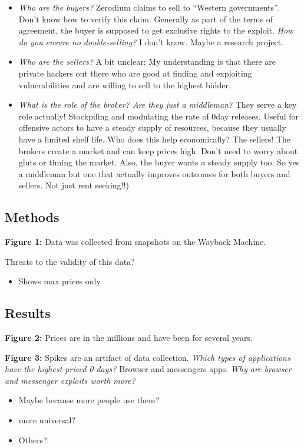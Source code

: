 \documentclass[11pt]{article}
\begin{document}
\begin{itemize}
    \item {\it Who are the buyers?} Zerodium claims to sell to ``Western governments''. Don't know how to verify this claim. Generally as part of the terms of agreement, the buyer is supposed to get exclusive rights to the exploit. {\it How do you ensure no double-selling?} I don't know. Maybe a research project. 
    \item {\it Who are the sellers?} A bit unclear; My understanding is that there are private hackers out there who are good at finding and exploiting vulnerabilities and are willing to sell to the highest bidder.  
    \item {\it What is the role of the broker? Are they just a middleman?} They serve a key role actually! Stockpiling and modulating the rate of 0day releases. Useful for offensive actors to have a steady supply of resources, because they usually have a limited shelf life. Who does this help economically? The sellers! The brokers create a market and can keep prices high. Don't need to worry about gluts or timing the market. Also, the buyer wants a steady supply too. So yes a middleman but one that actually improves outcomes for both buyers and sellers. Not just rent seeking!!)
\end{itemize}

\subsection{Methods}

{\bf Figure 1:} Data was collected from snapshots on the Wayback Machine. 

Threats to the validity of this data?
\begin{itemize}
    \item Shows max prices only 
\end{itemize}

\subsection{Results}

{\bf Figure 2:} Prices are in the millions and have been for several years. 

{\bf Figure 3:} Spikes are an artifact of data collection. {\it Which types of applications have the highest-priced 0-days?} Browser and messengers apps. {\it Why are browser and messenger exploits worth more?}
\begin{itemize}
    \item Maybe because more people use them?
    \item more universal?
    \item Others?
\end{itemize}
\end{document}
